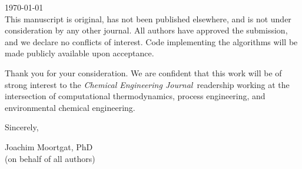 \documentclass[11pt, a4paper]{letter}
\newcommand{\whichjob}{\textit{Chemical Engineering Journal}~}
\begin{document}
\begin{letter}{
    \smallskip\today\\\smallskip
}
This manuscript is original, has not been published elsewhere, and is not under consideration by any other journal. All authors have approved the submission, and we declare no conflicts of interest. Code implementing the algorithms will be made publicly available upon acceptance.

Thank you for your consideration. We are confident that this work will be of strong interest to the \whichjob readership working at the intersection of computational thermodynamics, process engineering, and environmental chemical engineering.

\closing{Sincerely,}

\vspace{2mm}
Joachim Moortgat, PhD\\
(on behalf of all authors)

\end{letter}
\end{document}
